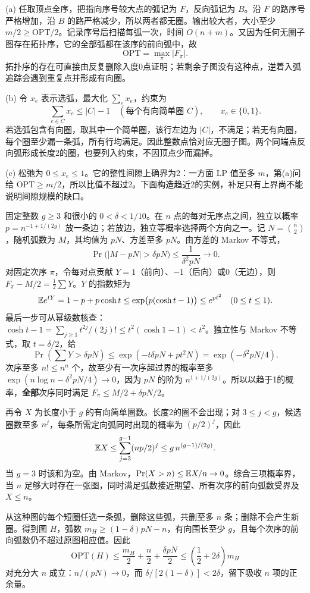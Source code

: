 \begin{solution}
(a) 任取顶点全序，把指向序号较大点的弧记为 $F$，反向弧记为 $B$。沿 $F$ 的路序号严格增加，沿 $B$ 的路严格减少，所以两者都无圈。输出较大者，大小至少 $m/2\ge\mathrm{OPT}/2$。记录序号后扫描每弧一次，时间 $O(n+m)$。又因为任何无圈子图存在拓扑序，它的全部弧都在该序的前向弧中，故
\[
 \mathrm{OPT}=\max_{\pi}\bigl|F_\pi\bigr|.
\]
拓扑序的存在可直接由反复删除入度0点证明；若剩余子图没有这种点，逆着入弧追踪会遇到重复点并形成有向圈。

(b) 令 $x_e$ 表示选弧，最大化 $\sum_e x_e$，约束为
\[
 \sum_{e\in C}x_e\le |C|-1\quad(\text{每个有向简单圈 }C),
 \qquad x_e\in\{0,1\}.
\]
若选弧包含有向圈，取其中一个简单圈，该行左边为 $|C|$，不满足；若无有向圈，每个圈至少漏一条弧，所有行均满足。因此整数点恰对应无圈子图。两个同端点反向弧形成长度2的圈，也要列入约束，不因顶点少而漏掉。

(c) 松弛为 $0\le x_e\le1$。它的整性间隙上确界为2：一方面 LP 值至多 $m$，第(a)问给 $\mathrm{OPT}\ge m/2$，所以比值不超过2。下面构造趋近2的实例，补足只有上界尚不能说明间隙规模的缺口。

固定整数 $g\ge3$ 和很小的 $0<\delta<1/10$。在 $n$ 点的每对无序点之间，独立以概率 $p=n^{-1+1/(2g)}$ 放一条边；若放边，独立等概率选择两个方向之一。记 $N=\binom n2$，随机弧数为 $M$，其均值为 $pN$、方差至多 $pN$。由方差的 Markov 不等式，
\[
 \Pr\bigl(|M-pN|>\delta pN\bigr)\le\frac1{\delta^2pN}\longrightarrow0.
\]
对固定次序 $\pi$，令每对点贡献 $Y=1$（前向）、$-1$（后向）或0（无边），则 $F_\pi-M/2=\tfrac12\sum Y$。$Y$ 的指数矩为
\[
 \mathbb E e^{tY}=1-p+p\cosh t
 \le\exp\bigl(p(\cosh t-1)\bigr)\le e^{pt^2}
 \quad(0\le t\le1).
\]
最后一步可从幂级数核查：$\cosh t-1=\sum_{j\ge1}t^{2j}/(2j)!\le t^2(\cosh1-1)<t^2$。独立性与 Markov 不等式，取 $t=\delta/2$，给
\[
 \Pr\!\left(\sum Y>\delta pN\right)
 \le\exp(-t\delta pN+pt^2N)
 =\exp(-\delta^2pN/4).
\]
次序至多 $n!\le n^n$ 个，故至少有一次序超过界的概率至多
$\exp(n\log n-\delta^2pN/4)\to0$，因为 $pN$ 的阶为 $n^{1+1/(2g)}$。所以以趋于1的概率，\textbf{全部}次序同时满足 $F_\pi\le M/2+\delta pN/2$。

再令 $X$ 为长度小于 $g$ 的有向简单圈数。长度2的圈不会出现；对 $3\le j<g$，候选圈数至多 $n^j$，每条所需定向弧同时出现的概率为 $(p/2)^j$，因此
\[
 \mathbb E X\le\sum_{j=3}^{g-1}(np/2)^j
 \le g\,n^{(g-1)/(2g)}.
\]
当 $g=3$ 时该和为空。由 Markov，$\Pr(X>n)\le\mathbb E X/n\to0$。综合三项概率界，当 $n$ 足够大时存在一张图，同时满足弧数接近期望、所有次序的前向弧数受界及 $X\le n$。

从这种图的每个短圈任选一条弧，删除这些弧，共删至多 $n$ 条；删除不会产生新圈。得到图 $H$，弧数 $m_H\ge(1-\delta)pN-n$，有向围长至少 $g$，且每个次序的前向弧数仍不超过原图相应值。因此
\[
 \mathrm{OPT}(H)\le \frac{m_H}{2}+\frac n2+\frac{\delta pN}{2}
 \le\left(\frac12+2\delta\right)m_H
\]
对充分大 $n$ 成立：$n/(pN)\to0$，而 $\delta/[2(1-\delta)]<2\delta$，留下吸收 $n$ 项的正余量。


\end{solution}

